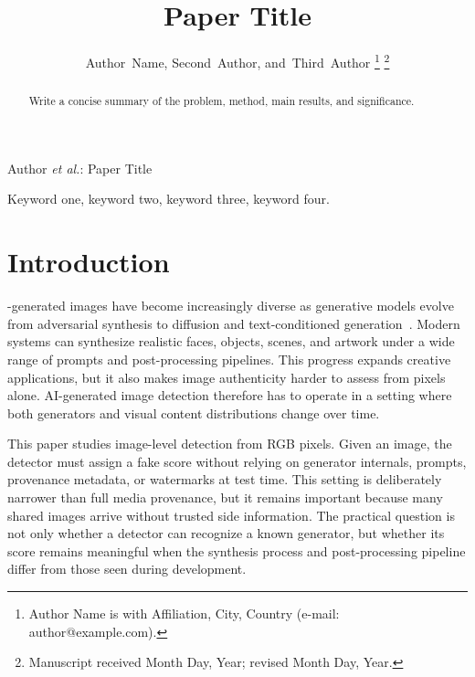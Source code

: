 \documentclass[lettersize,journal]{IEEEtran}
\begin{document}
\title{Paper Title}

\author{Author~Name,
        Second~Author,
        and~Third~Author%
\thanks{Author Name is with Affiliation, City, Country (e-mail: author@example.com).}
\thanks{Manuscript received Month Day, Year; revised Month Day, Year.}}

%
{Author \MakeLowercase{\textit{et al.}}: Paper Title}

\maketitle

\begin{abstract}
Write a concise summary of the problem, method, main results, and significance.
\end{abstract}

\begin{IEEEkeywords}
Keyword one, keyword two, keyword three, keyword four.
\end{IEEEkeywords}

\section{Introduction}
-generated images have become increasingly diverse as generative models evolve from adversarial synthesis to diffusion and text-conditioned generation~\cite{goodfellow2014gan,karras2019stylegan,ho2020ddpm,dhariwal2021diffusion,rombach2022ldm}. Modern systems can synthesize realistic faces, objects, scenes, and artwork under a wide range of prompts and post-processing pipelines. This progress expands creative applications, but it also makes image authenticity harder to assess from pixels alone. AI-generated image detection therefore has to operate in a setting where both generators and visual content distributions change over time.

This paper studies image-level detection from RGB pixels. Given an image, the detector must assign a fake score without relying on generator internals, prompts, provenance metadata, or watermarks at test time. This setting is deliberately narrower than full media provenance, but it remains important because many shared images arrive without trusted side information. The practical question is not only whether a detector can recognize a known generator, but whether its score remains meaningful when the synthesis process and post-processing pipeline differ from those seen during development.
\end{document}
